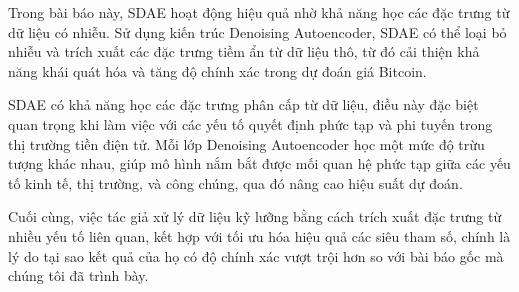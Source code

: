 Trong bài báo này, SDAE hoạt động hiệu quả nhờ khả năng học các đặc trưng từ dữ liệu có nhiễu. Sử dụng kiến trúc Denoising Autoencoder, SDAE có thể loại bỏ nhiễu và trích xuất các đặc trưng tiềm ẩn từ dữ liệu thô, từ đó cải thiện khả năng khái quát hóa và tăng độ chính xác trong dự đoán giá Bitcoin.

SDAE có khả năng học các đặc trưng phân cấp từ dữ liệu, điều này đặc biệt quan trọng khi làm việc với các yếu tố quyết định phức tạp và phi tuyến trong thị trường tiền điện tử. Mỗi lớp Denoising Autoencoder học một mức độ trừu tượng khác nhau, giúp mô hình nắm bắt được mối quan hệ phức tạp giữa các yếu tố kinh tế, thị trường, và công chúng, qua đó nâng cao hiệu suất dự đoán.

Cuối cùng, việc tác giả xử lý dữ liệu kỹ lưỡng bằng cách trích xuất đặc trưng từ nhiều yếu tố liên quan, kết hợp với tối ưu hóa hiệu quả các siêu tham số, chính là lý do tại sao kết quả của họ có độ chính xác vượt trội hơn so với bài báo gốc mà chúng tôi đã trình bày.
